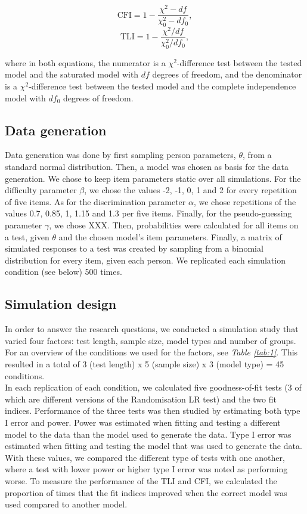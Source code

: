 \documentclass[Royal,sageapa,times,doublespace]{sagej}
\begin{document}
\begin{equation}
\text{CFI} = 1 - \frac{\chi^{2} - df}{\chi^{2}_{0} - df_0},
\end{equation}
\begin{equation}
\text{TLI} = 1 - \frac{\chi^{2}/df}{\chi^{2}_{0}/df_0},
\end{equation}

where in both equations, the numerator is a $\chi^2$-difference test between the tested model and the saturated model with $df$ degrees of freedom, and the denominator is a $\chi^2$-difference test between the tested model and the complete independence model with $df_0$ degrees of freedom.

\subsection{Data generation}
Data generation was done by first sampling person parameters, $\theta$, from a standard normal distribution. Then, a model was chosen as basis for the data generation. We chose to keep item parameters static over all simulations. For the difficulty parameter $\beta$, we chose the values -2, -1, 0, 1 and 2 for every repetition of five items. As for the discrimination parameter $\alpha$, we chose repetitions of the values 0.7, 0.85, 1, 1.15 and 1.3 per five items. Finally, for the pseudo-guessing parameter $\gamma$, we chose XXX. Then, probabilities were calculated for all items on a test, given $\theta$ and the chosen model's item parameters. Finally, a matrix of simulated responses to a test was created by sampling from a binomial distribution for every item, given each person. We replicated each simulation condition (see below) 500 times.

\subsection{Simulation design}
In order to answer the research questions, we conducted a simulation study that varied four factors: test length, sample size, model types and number of groups. For an overview of the conditions we used for the factors, see \textit{Table \ref{tab:1}}. This resulted in a total of 3 (test length) x 5 (sample size) x 3 (model type) = 45 conditions. \\
\indent In each replication of each condition, we calculated five goodness-of-fit tests (3 of which are different versions of the Randomisation LR test) and the two fit indices. Performance of the three tests was then studied by estimating both type I error and power. Power was estimated when fitting and testing a different model to the data than the model used to generate the data. Type I error was estimated when fitting and testing the model that was used to generate the data. With these values, we compared the different type of tests with one another, where a test with lower power or higher type I error was noted as performing worse.
To measure the performance of the TLI and CFI, we calculated the proportion of times that the fit indices improved when the correct model was used compared to another model.
\end{document}

